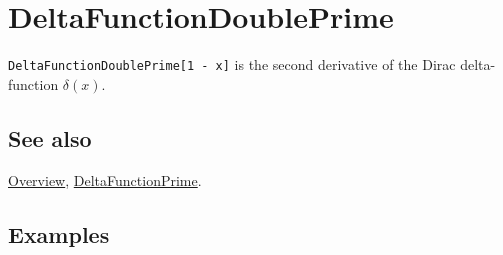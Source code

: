 \documentclass[../FeynCalcManual.tex]{subfiles}
\begin{document}
\hypertarget{deltafunctiondoubleprime}{
\section{DeltaFunctionDoublePrime}\label{deltafunctiondoubleprime}}

\texttt{DeltaFunctionDoublePrime[\allowbreak{}1 - x]} is the second
derivative of the Dirac delta-function \(\delta (x)\).

\subsection{See also}

\hyperlink{toc}{Overview},
\hyperlink{deltafunctionprime}{DeltaFunctionPrime}.

\subsection{Examples}
\end{document}
